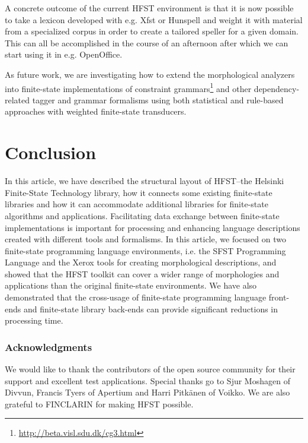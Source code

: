 \documentclass{llncs}
\begin{document}
A concrete outcome of the current HFST environment is that it is now possible to take 
a lexicon developed with e.g. Xfst or Hunspell and weight it with material from a specialized corpus 
in order to create a tailored speller for a given domain. This can all be accomplished in the course 
of an afternoon after which we can start using it in e.g. OpenOffice.

As future work, we are investigating how to extend the morphological analyzers 
into finite-state implementations of constraint 
grammars\footnote{\url{http://beta.visl.sdu.dk/cg3.html}} and other 
dependency-related tagger and grammar formalisms using both statistical
and rule-based approaches with weighted finite-state transducers. 

%
%
%

\section{Conclusion}\label{hfst:conclusion}
In this article, we have described the structural layout of HFST--the Helsinki Finite-State Technology library,
how it connects some existing finite-state libraries and how it can accommodate additional 
libraries for finite-state algorithms and applications. Facilitating data exchange between 
finite-state implementations is important for processing and enhancing language descriptions created with different
tools and formalisms. In this article, we focused on two finite-state programming language environments, 
i.e. the SFST Programming Language and the Xerox tools for creating morphological descriptions, and showed
that the HFST toolkit can cover a wider range of morphologies and applications than the original finite-state environments. We have also demonstrated that the cross-usage of finite-state programming language 
front-ends and finite-state library back-ends can provide significant reductions in processing time.

\subsubsection*{Acknowledgments}
We would like to thank the contributors of the open source community for their support and excellent test applications. Special thanks go to Sjur Moshagen of Divvun, Francis Tyers of Apertium and Harri Pitkänen of Voikko. We are also grateful to FINCLARIN for making HFST possible.



\end{document}
